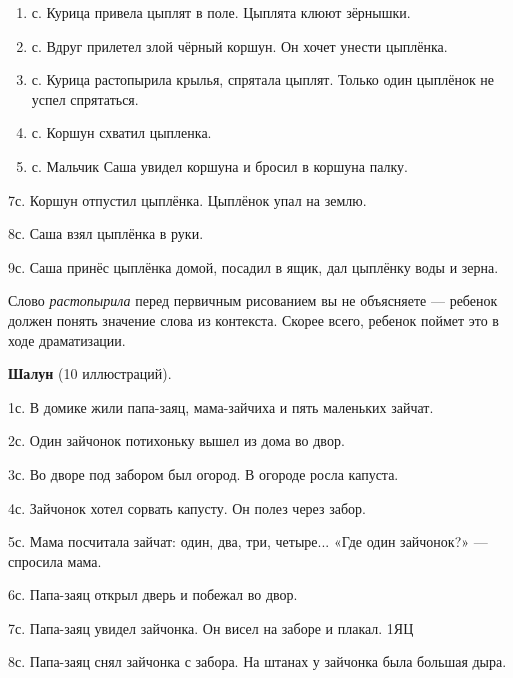 \documentclass{book}
\renewcommand{\emph}[1]{\textit{#1}}
\begin{document}
\begin{enumerate}
\def\labelenumi{\arabic{enumi}.}
\setcounter{enumi}{1}
\item
  
  с. Курица привела цыплят в поле. Цыплята клюют зёрнышки.
  
\item
  
  с. Вдруг прилетел злой чёрный коршун. Он хочет унести цыплёнка.
  
\item
  
  с. Курица растопырила крылья, спрятала цыплят. Только один цыплёнок не
  успел спрятаться.
  
\item
  
  с. Коршун схватил цыпленка.
  
\item
  
  с. Мальчик Саша увидел коршуна и бросил в коршуна палку.
  
\end{enumerate}


7с. Коршун отпустил цыплёнка. Цыплёнок упал на землю.

8с. Саша взял цыплёнка в руки.

9с. Саша принёс цыплёнка домой, посадил в ящик, дал цыплёнку воды и
зерна.

Слово \emph{растопырила} перед первичным рисованием вы не объясняете ---
ребенок должен понять значение слова из контекста. Скорее всего, ребенок
поймет это в ходе драматизации.

\textbf{Шалун} (10 иллюстраций).

1с. В домике жили папа-заяц, мама-зайчиха и пять маленьких зайчат.

2с. Один зайчонок потихоньку вышел из дома во двор.

3с. Во дворе под забором был огород. В огороде росла капуста.

4с. Зайчонок хотел сорвать капусту. Он полез через забор.

5с. Мама посчитала зайчат: один, два, три, четыре... «Где один
зайчонок?» --- спросила мама.

6с. Папа-заяц открыл дверь и побежал во двор.

7с. Папа-заяц увидел зайчонка. Он висел на заборе и плакал. 1ЯЦ

8с. Папа-заяц снял зайчонка с забора. На штанах у зайчонка была большая
дыра.
\end{document}
